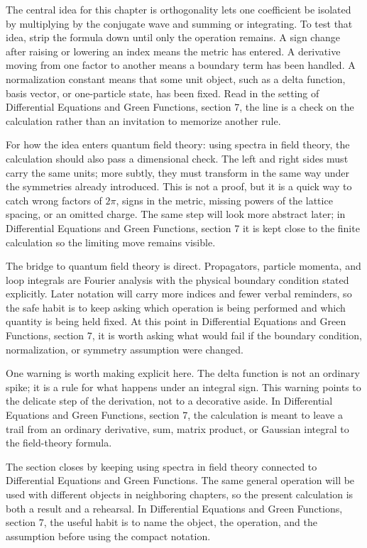 The central idea for this chapter is orthogonality lets one coefficient be isolated by multiplying by the conjugate wave and summing or integrating.  To test that idea, strip the formula down until only the operation remains.  A sign change after raising or lowering an index means the metric has entered.  A derivative moving from one factor to another means a boundary term has been handled.  A normalization constant means that some unit object, such as a delta function, basis vector, or one-particle state, has been fixed.  Read in the setting of Differential Equations and Green Functions, section 7, the line is a check on the calculation rather than an invitation to memorize another rule.

For how the idea enters quantum field theory: using spectra in field theory, the calculation should also pass a dimensional check.  The left and right sides must carry the same units; more subtly, they must transform in the same way under the symmetries already introduced.  This is not a proof, but it is a quick way to catch wrong factors of \(2\pi\), signs in the metric, missing powers of the lattice spacing, or an omitted charge.  The same step will look more abstract later; in Differential Equations and Green Functions, section 7 it is kept close to the finite calculation so the limiting move remains visible.

The bridge to quantum field theory is direct.  Propagators, particle momenta, and loop integrals are Fourier analysis with the physical boundary condition stated explicitly.  Later notation will carry more indices and fewer verbal reminders, so the safe habit is to keep asking which operation is being performed and which quantity is being held fixed.  At this point in Differential Equations and Green Functions, section 7, it is worth asking what would fail if the boundary condition, normalization, or symmetry assumption were changed.

One warning is worth making explicit here.  The delta function is not an ordinary spike; it is a rule for what happens under an integral sign.  This warning points to the delicate step of the derivation, not to a decorative aside.  In Differential Equations and Green Functions, section 7, the calculation is meant to leave a trail from an ordinary derivative, sum, matrix product, or Gaussian integral to the field-theory formula.

The section closes by keeping using spectra in field theory connected to Differential Equations and Green Functions.  The same general operation will be used with different objects in neighboring chapters, so the present calculation is both a result and a rehearsal.  In Differential Equations and Green Functions, section 7, the useful habit is to name the object, the operation, and the assumption before using the compact notation.



